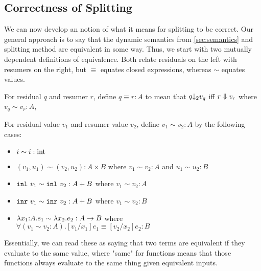 %
%



\subsection{Correctness of Splitting}

We can now develop an notion of what it means for splitting to be correct.  
Our general approach is to say that the dynamic semantics from \ref{sec:semantics} and splitting method are equivalent in some way.  
Thus, we start with two mutually dependent definitions of equivalence.  
Both relate residuals on the left with resumers on the right,
but $\equiv$ equates closed expressions, whereas $\sim$ equates values.

\begin{definition}
For residual $q$ and resumer $r$, define $q \equiv r : A$ to mean that 
$q {\downarrow_{ 2}} v_q$ iff ${r} \Downarrow {v_r}$ where $v_q \sim v_r : A$, 
\end{definition}

\begin{definition}
For residual value $v_1$ and resumer value $v_2$, define $v_1 \sim v_2 : A$ by the following cases:
\begin{itemize}
\item $i \sim i : {\rm int}$
\item $(v_1,u_1) \sim (v_2,u_2) : A \times B$ where $v_1 \sim v_2 : A$ and $u_1 \sim u_2 : B$
\item ${\tt inl}~v_1 \sim {\tt inl}~v_2 : A + B$ where $v_1 \sim v_2 : A$
\item ${\tt inr}~v_1 \sim {\tt inr}~v_2 : A + B$ where $v_1 \sim v_2 : B$
\item $\lambda{x_1}\mathrm{:}{A}.{e_1} \sim \lambda x_2.e_2 : A \to B$ where \\ $\forall (v_1 \sim v_2 : A). [v_1/x_1]e_1 \equiv [v_2/x_2]e_2 : B$
\end{itemize}
\end{definition}

Essentially, we can read these as saying that two terms are equivalent if they evaluate to the same value,
where "same" for functions means that those functions always evaluate to the same thing given equivalent inputs.

